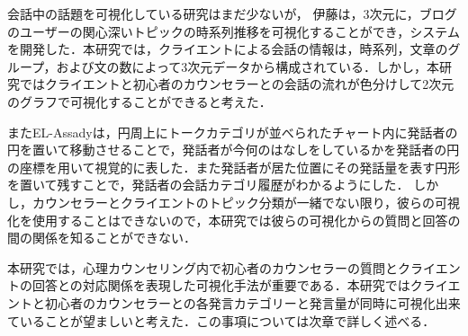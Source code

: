\documentclass[shuuron]{kuee}
\begin{document}
会話中の話題を可視化している研究はまだ少ないが，
伊藤\cite{itoh2010interactive}は，3次元に，ブログのユーザーの関心深いトピックの時系列推移を可視化することができ，システムを開発した．本研究では，クライエントによる会話の情報は，時系列，文章のグループ，および文の数によって3次元データから構成されている．しかし，本研究ではクライエントと初心者のカウンセラーとの会話の流れが色分けして2次元のグラフで可視化することができると考えた．%

またEL-Assady\cite{el2016contovi}は，円周上にトークカテゴリが並べられたチャート内に発話者の円を置いて移動させることで，発話者が今何のはなしをしているかを発話者の円の座標を用いて視覚的に表した．また発話者が居た位置にその発話量を表す円形を置いて残すことで，発話者の会話カテゴリ履歴がわかるようにした．
しかし，カウンセラーとクライエントのトピック分類が一緒でない限り，彼らの可視化を使用することはできないので，本研究では彼らの可視化からの質問と回答の間の関係を知ることができない．

本研究では，心理カウンセリング内で初心者のカウンセラーの質問とクライエントの回答との対応関係を表現した可視化手法が重要である．本研究ではクライエントと初心者のカウンセラーとの各発言カテゴリーと発言量が同時に可視化出来ていることが望ましいと考えた．この事項については次章で詳しく述べる．
\end{document}
